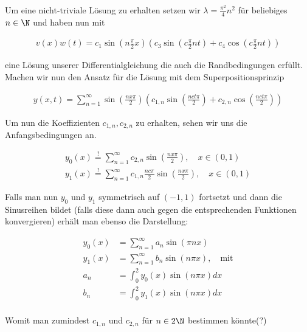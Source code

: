 \begin{solution}
Um eine nicht-triviale Lösung zu erhalten setzen wir $\lambda = \frac{\pi^2}{4}n^2$ für beliebiges $n \in \N$ und haben nun mit

\begin{align*}
  v(x)w(t)
  =
  c_1\sin\left(n\frac{\pi}{2} x\right)
  \left(c_3 \sin\left(c\frac{\pi}{2}nt\right) +
  c_4 \cos\left(c\frac{\pi}{2}nt\right)\right)
\end{align*}

eine Lösung unserer Differentialgleichung die auch die Randbedingungen erfüllt.
Machen wir nun den Ansatz für die Lösung mit dem Superpositionsprinzip

\begin{align*}
  y(x,t)
  =
  \sum_{n=1}^{\infty} \sin\left(\frac{nx\pi}{2}\right)
  \left(c_{1,n}\sin\left(\frac{nct\pi}{2}\right)+c_{2,n}\cos\left(\frac{nct\pi}{2}\right)\right)
\end{align*}

Um nun die Koeffizienten $c_{1,n},c_{2,n}$ zu erhalten, sehen wir uns die
Anfangsbedingungen an.

\begin{align*}
  y_0(x)
  \stackrel{!}{=}
  \sum_{n=1}^\infty c_{2,n}\sin\left(\frac{nx\pi}{2}\right),       \quad x \in (0,1) \\
  y_1(x)
  \stackrel{!}{=}
  \sum_{n=1}^\infty c_{1,n}\frac{nc\pi}{2}\sin\left(\frac{nx\pi}{2}\right),  \quad x \in (0,1)
\end{align*}

Falls man nun $y_0$ und $y_1$ symmetrisch auf $(-1,1)$
fortsetzt und dann die Sinusreihen bildet (falls diese dann auch gegen die entsprechenden Funktionen
konvergieren) erhält man ebenso die Darstellung:

\begin{align*}
  y_0(x)
  &=
  \sum_{n=1}^\infty a_n \sin(\pi nx) \\
  y_1(x)
  &=
  \sum_{n=1}^\infty b_n \sin(n \pi x), \quad \text{mit} \\
  a_n
  &=
  \int_0^2 y_0(x)\sin(n\pi x) dx \\
  b_n
  &=
  \int_0^2 y_1(x)\sin(n\pi x) dx \\
\end{align*}

Womit man zumindest $c_{1,n}$ und $c_{2,n}$ für $n \in 2\N$ bestimmen könnte(?)

\end{solution}
